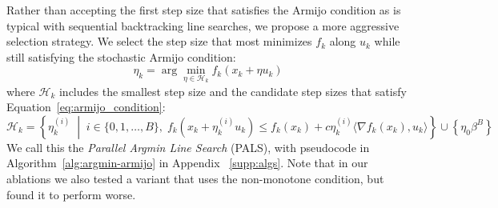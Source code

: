 \documentclass{article}
\newcommand{\xAt}[1]{x_{#1}}
\newcommand{\update}{u}
\newcommand{\updateAt}[1]{\update_{#1}}
\newcommand{\stepSize}{\eta}
\newcommand{\stepSizeInit}{\eta_0}
\newcommand{\stepSizeAt}[1]{\stepSize_{#1}}
\begin{document}
Rather than accepting the first step size that satisfies the Armijo condition as is typical with sequential backtracking line searches, we propose a more aggressive selection strategy. We select the step size that most minimizes $f_k$ along $\updateAt{k}$ while still satisfying the stochastic Armijo condition:
%
\begin{equation}\label{eq_armijo_sgd}
    \stepSizeAt{k} = \arg\min_{\stepSize \in \mathcal{H}_k} f_k(\xAt{k} + \eta \updateAt{k})
\end{equation}
%
where $\mathcal{H}_k$ includes the smallest step size and the candidate step sizes that satisfy Equation~\ref{eq:armijo_condition}:
%
\begin{equation} 
\mathcal{H}_k = \left\{ \eta_k^{(i)} \;\middle|\; i \in \{0, 1, \dots, B\},\;
  f_k(x_k + \eta_k^{(i)} u_k) \leq f_k(x_k) + c\eta_k^{(i)} \langle \nabla f_k(x_k), u_k\rangle \right\}
  \cup \left\{ \eta_0 \beta^B \right\}
    \label{eq:min_search}
\end{equation}
%
We call this the \textit{Parallel Argmin Line Search} (PALS), with pseudocode in Algorithm~\ref{alg:argmin-armijo} in Appendix ~\ref{supp:algs}. 
Note that in our ablations we also tested a variant that uses the non-monotone condition, but found it to perform worse.
\end{document}
